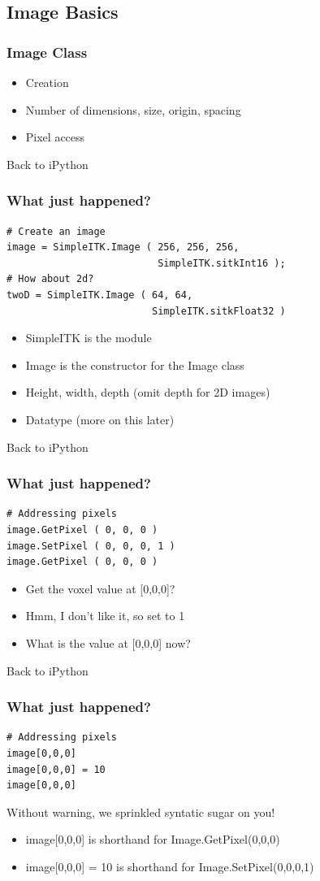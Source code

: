\subsection{Image Basics}

\begin{frame}
\frametitle{Image Class}
\begin{itemize}
  \item Creation
  \item Number of dimensions, size, origin, spacing
  \item Pixel access
\end{itemize}
Back to iPython
\end{frame}

\begin{frame}[fragile]
\frametitle{What just happened?}
\lstpython
\begin{lstlisting}
# Create an image
image = SimpleITK.Image ( 256, 256, 256,
                          SimpleITK.sitkInt16 );
# How about 2d?
twoD = SimpleITK.Image ( 64, 64,
                         SimpleITK.sitkFloat32 )
\end{lstlisting}

\begin{itemize}
  \item SimpleITK is the module
  \item Image is the constructor for the Image class
  \item Height, width, depth (omit depth for 2D images)
  \item Datatype (more on this later)
\end{itemize}
Back to iPython
\end{frame}


\begin{frame}[fragile]
\frametitle{What just happened?}
\lstpython
\begin{lstlisting}
# Addressing pixels
image.GetPixel ( 0, 0, 0 )
image.SetPixel ( 0, 0, 0, 1 )
image.GetPixel ( 0, 0, 0 )
\end{lstlisting}
\begin{itemize}
  \item Get the voxel value at [0,0,0]?
  \item Hmm, I don't like it, so set to 1
  \item What is the value at [0,0,0] now?
\end{itemize}
Back to iPython
\end{frame}

\begin{frame}[fragile]
\frametitle{What just happened?}
\lstpython
\begin{lstlisting}
# Addressing pixels
image[0,0,0]
image[0,0,0] = 10
image[0,0,0]
\end{lstlisting}
Without warning, we sprinkled syntatic sugar on you!
\begin{itemize}
  \item image[0,0,0] is shorthand for Image.GetPixel(0,0,0)
  \item image[0,0,0] = 10 is shorthand for Image.SetPixel(0,0,0,1)
\end{itemize}
\end{frame}

